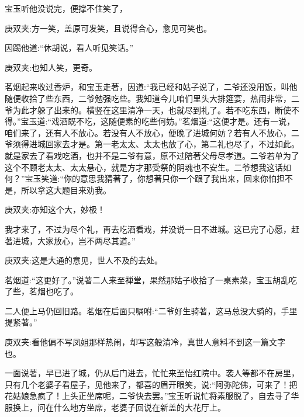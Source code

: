 \begin{parag}
    宝玉听他没说完，便撑不住笑了，\begin{note}庚双夹:方一笑，盖原可发笑，且说得合心，愈见可笑也。\end{note}因踢他道:“休胡说，看人听见笑话。”\begin{note}庚双夹:也知人笑，更奇。\end{note}茗烟起来收过香炉，和宝玉走著，因道:“我已经和姑子说了，二爷还没用饭，叫他随便收拾了些东西，二爷勉强吃些。我知道今儿咱们里头大排筵宴，热闹非常，二爷为此才躲了出来的。横竖在这里清净一天，也就尽到礼了。若不吃东西，断使不得。”宝玉道:“戏酒既不吃，这随便素的吃些何妨。”茗烟道:“这便才是。还有一说，咱们来了，还有人不放心。若没有人不放心，便晚了进城何妨？若有人不放心，二爷须得进城回家去才是。第一老太太、太太也放了心，第二礼也尽了，不过如此。就是家去了看戏吃酒，也并不是二爷有意，原不过陪著父母尽孝道。二爷若单为了这个不顾老太太、太太悬心，就是方才那受祭的阴魂也不安生。二爷想我这话如何？”宝玉笑道:“你的意思我猜著了，你想著只你一个跟了我出来，回来你怕担不是，所以拿这大题目来劝我。\begin{note}庚双夹:亦知这个大，妙极！\end{note}我才来了，不过为尽个礼，再去吃酒看戏，并没说一日不进城。这已完了心愿，赶著进城，大家放心，岂不两尽其道。”\begin{note}庚双夹:这是大通的意见，世人不及的去处。\end{note}茗烟道:“这更好了。”说著二人来至禅堂，果然那姑子收拾了一桌素菜，宝玉胡乱吃了些，茗烟也吃了。
\end{parag}


\begin{parag}
    二人便上马仍回旧路。茗烟在后面只嘱咐:“二爷好生骑著，这马总没大骑的，手里提紧著。”\begin{note}庚双夹:看他偏不写凤姐那样热闹，却写这般清冷，真世人意料不到这一篇文字也。\end{note}一面说著，早已进了城，仍从后门进去，忙忙来至怡红院中。袭人等都不在房里，只有几个老婆子看屋子，见他来了，都喜的眉开眼笑，说:“阿弥陀佛，可来了！把花姑娘急疯了！上头正坐席呢，二爷快去罢。”宝玉听说忙将素服脱了，自去寻了华服换上，问在什么地方坐席，老婆子回说在新盖的大花厅上。
\end{parag}


